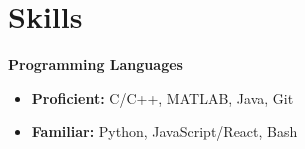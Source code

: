 \documentclass[11pt]{article}
\newcommand{\resumeItem}[1]{
  \item\small{
    {#1 \vspace{-2pt}}
  }
}
\newcommand{\resumeItemListStart}{\begin{itemize}}
\newcommand{\resumeItemListEnd}{\end{itemize}\vspace{-5pt}}
\begin{document}
\section{Skills}
 \begin{itemize}[leftmargin=0.1in, label={}]
    \small{\item{
     \textbf{Programming Languages} {\ }
     \vspace{-7pt}
    \resumeItemListStart
        \resumeItem{\textbf{Proficient:}{ C/C++, MATLAB, Java, Git}}
        \resumeItem{\textbf{Familiar:}{ Python, JavaScript/React, Bash}}
    \resumeItemListEnd

    }}
 \end{itemize}
 \vspace{-3pt}


\vspace{-5.5mm}
 
\end{document}
